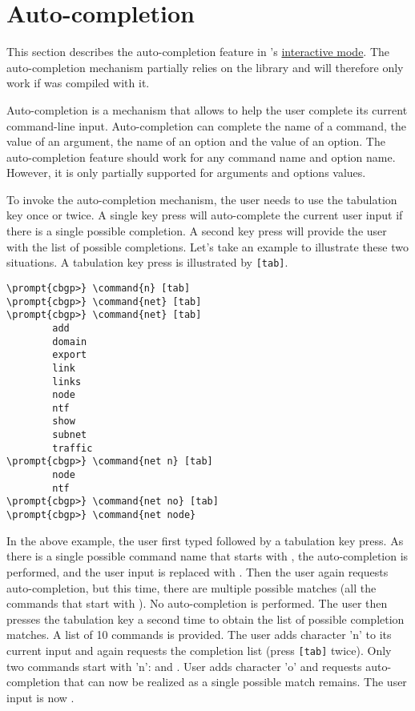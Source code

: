 \section{Auto-completion}
\label{sec:user-interface-completion}

This section describes the auto-completion feature in
's
\hyperref[sec:user-interface-interactive]{interactive mode}. The
auto-completion mechanism partially relies on the
 library and will therefore only work if
 was compiled with it.

Auto-completion is a mechanism that allows to help the user complete
its current command-line input. Auto-completion can complete the name
of a command, the value of an argument, the name of an option and the
value of an option. The auto-completion feature should work for any
command name and option name. However, it is only partially supported
for arguments and options values.

To invoke the auto-completion mechanism, the user needs to use the
tabulation key once or twice. A single key press will auto-complete
the current user input if there is a single possible completion. A
second key press will provide the user with the list of possible
completions. Let's take an example to illustrate these two
situations. A tabulation key press is illustrated by \verb|[tab]|.

\begin{Verbatim}[commandchars=\\\{\}]
\prompt{cbgp>} \command{n} [tab]
\prompt{cbgp>} \command{net} [tab]
\prompt{cbgp>} \command{net} [tab]
        add
        domain
        export
        link
        links
        node
        ntf
        show
        subnet
        traffic
\prompt{cbgp>} \command{net n} [tab]
        node
        ntf
\prompt{cbgp>} \command{net no} [tab]
\prompt{cbgp>} \command{net node}
\end{Verbatim}

In the above example, the user first typed  followed by a
tabulation key press. As there is a single possible command name that
starts with , the auto-completion is performed, and the
user input is replaced with . Then the user again
requests auto-completion, but this time, there are multiple possible
matches (all the commands that start with ). No
auto-completion is performed. The user then presses the tabulation key
a second time to obtain the list of possible completion matches. A
list of 10 commands is provided. The user adds character 'n' to its
current input and again requests the completion list (press
\verb|[tab]| twice). Only two commands start with 'n': 
and . User adds character 'o' and requests
auto-completion that can now be realized as a single possible match
remains. The user input is now .

